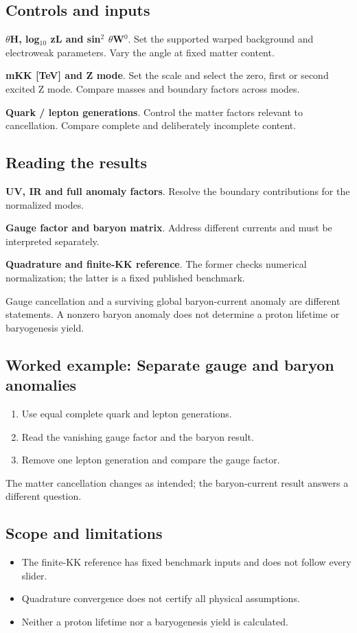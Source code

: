 \documentclass[11pt,a4paper]{article}
\begin{document}
\subsection*{Controls and inputs}
\textbf{\ensuremath{\theta}H, log\ensuremath{{}_{10}} zL and sin\ensuremath{{}^{2}} \ensuremath{\theta}W\ensuremath{{}^{0}}}. Set the supported warped background and electroweak parameters. Vary the angle at fixed matter content.

\textbf{mKK [TeV] and Z mode}. Set the scale and select the zero, first or second excited Z mode. Compare masses and boundary factors across modes.

\textbf{Quark / lepton generations}. Control the matter factors relevant to cancellation. Compare complete and deliberately incomplete content.

\subsection*{Reading the results}
\textbf{UV, IR and full anomaly factors}. Resolve the boundary contributions for the normalized modes.

\textbf{Gauge factor and baryon matrix}. Address different currents and must be interpreted separately.

\textbf{Quadrature and finite-KK reference}. The former checks numerical normalization; the latter is a fixed published benchmark.

Gauge cancellation and a surviving global baryon-current anomaly are different statements. A nonzero baryon anomaly does not determine a proton lifetime or baryogenesis yield.
\subsection*{Worked example: Separate gauge and baryon anomalies}
\begin{enumerate}
\item Use equal complete quark and lepton generations.
\item Read the vanishing gauge factor and the baryon result.
\item Remove one lepton generation and compare the gauge factor.
\end{enumerate}
The matter cancellation changes as intended; the baryon-current result answers a different question.
\subsection*{Scope and limitations}
\begin{itemize}
\item The finite-KK reference has fixed benchmark inputs and does not follow every slider.
\item Quadrature convergence does not certify all physical assumptions.
\item Neither a proton lifetime nor a baryogenesis yield is calculated.
\end{itemize}
\end{document}
